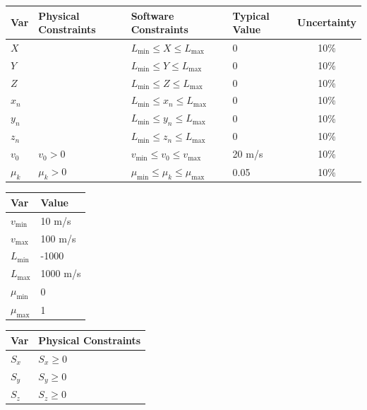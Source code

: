 \documentclass[12pt]{article}
\begin{document}
	\begin{table}[!h]
		\caption{Input Variables} \label{TblInputVar}
		\renewcommand{\arraystretch}{1.2}
		\noindent \begin{longtable*}{l l l l c} 
			\toprule
			\textbf{Var} & \textbf{Physical Constraints} & \textbf{Software Constraints} &
			\textbf{Typical Value} & \textbf{Uncertainty}\\
			\midrule 
			$X$ &  & $L_{\text{min}} \leq X \leq L_{\text{max}}$ & 0 & 10\%
			\\
			$Y$ &  & $L_{\text{min}} \leq Y \leq L_{\text{max}}$ & 0 & 10\%
			\\
			$Z$ &  & $L_{\text{min}} \leq Z \leq L_{\text{max}}$ & 0 & 10\%
			\\
			$x_{n}$ &  & $L_{\text{min}} \leq x_{n} \leq L_{\text{max}}$ & 0 & 10\%
			\\
			$y_{n}$ &  & $L_{\text{min}} \leq y_{n} \leq L_{\text{max}}$ & 0 & 10\%
			\\
			$z_{n}$ &  & $L_{\text{min}} \leq z_{n} \leq L_{\text{max}}$ & 0 & 10\%
			\\
			$v_{0}$ & $v_{0} > 0$ & $v_{\text{min}} \leq v_{0} \leq v_{\text{max}}$ & 20 m/s & 10\%
			\\
			$\mu_{k}$ & $\mu_{k} > 0$ & $\mu_{\text{min}} \leq \mu_{k} \leq \mu_{\text{max}}$ & 0.05 & 10\%
			\\
			\bottomrule
		\end{longtable*}
	\end{table}
	
	\noindent 
	
	\begin{table}[!h]
		\caption{Specification Parameter Values} \label{TblSpecParams}
		\renewcommand{\arraystretch}{1.2}
		\noindent \begin{longtable*}{l l} 
			\toprule
			\textbf{Var} & \textbf{Value} \\
			\midrule 
			$v_\text{min}$ & 10 m/s\\
			$v_\text{max}$ & 100 m/s\\
			$L_\text{min}$ & -1000\\
			$L_\text{max}$ & 1000 m/s\\
			$\mu_\text{min}$ & 0\\
			$\mu_\text{max}$ & 1\\
			\bottomrule
		\end{longtable*}
	\end{table}
	
	\begin{table}[!h]
		\caption{Output Variables} \label{TblOutputVar}
		\renewcommand{\arraystretch}{1.2}
		\noindent \begin{longtable*}{l l} 
			\toprule
			\textbf{Var} & \textbf{Physical Constraints} \\
			\midrule 
			$S_{x}$ & $S_{x} \geq 0$
			\\
			$S_{y}$ & $S_{y} \geq 0$
			\\
			$S_{z}$ & $S_{z} \geq 0$
			\\
			\bottomrule
		\end{longtable*}
	\end{table}
	
\end{document}
